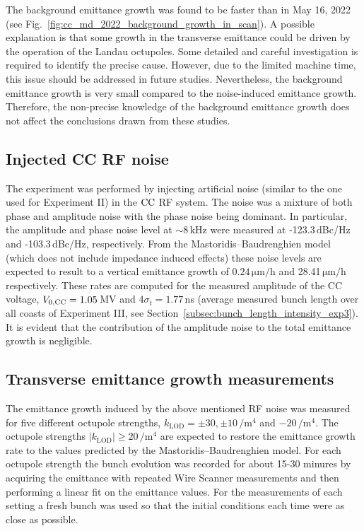 The background emittance growth was found to be faster than in May 16, 2022 (see Fig.~\ref{fig:cc_md_2022_background_growth_in_scan}). A possible explanation is that some growth in the transverse emittance could be driven by the operation of the Landau octupoles. Some detailed and careful investigation is required to identify the precise cause. However, due to the limited machine time, this issue should be addressed in future studies. Nevertheless, the background emittance growth is very small compared to the noise-induced emittance growth. Therefore, the non-precise knowledge of the background emittance growth does not affect the conclusions drawn from these studies. 



\subsection{Injected CC RF noise}\label{subsec:cc_rf_noise_exp3}
The experiment was performed by injecting artificial noise (similar to the one used for Experiment II) in the ${\mathrm{CC}}$ RF system. The noise was a mixture of both phase and amplitude noise with the phase noise being dominant. In particular, the amplitude and phase noise level at $\sim$8\,kHz were measured at -123.3\,dBc/Hz and -103.3\,dBc/Hz, respectively. From the Mastoridis--Baudrenghien model (which does not include impedance induced effects) these noise levels are expected to result to a vertical emittance growth of $0.24$\,$\mathrm{\mu m/h}$ and 28.41\,$\mathrm{\mu m/h}$ respectively. These rates are computed for the measured amplitude of the CC voltage, ${V_\mathrm{0, CC}}=1.05$\,MV and $4\sigma_t=1.77$\,ns (average measured bunch length over all coasts of Experiment III, see Section~\ref{subsec:bunch_length_intensity_exp3}). It is evident that the contribution of the amplitude noise to the total emittance growth is negligible. %


\subsection{Transverse emittance growth measurements}\label{subsec:cc_rf_noise_emit_growth_exp3}
The emittance growth induced by the above mentioned RF noise was measured for five different octupole strengths, $k_\mathrm{LOD}=\pm 30, \pm 10$\,$\mathrm{/m^4}$ and $-20$\,$\mathrm{/m^4}$. The octupole strengths $| k_\mathrm{LOD} | \geq 20$\,$\mathrm{/m^4}$ are expected to restore the emittance growth rate to the values predicted by the Mastoridis--Baudrenghien model. For each octupole strength the bunch evolution was recorded for about 15-30 minures by acquiring the emittance with repeated Wire Scanner measurements and then performing a linear fit on the emittance values. For the measurements of each setting a fresh bunch was used so that the initial conditions each time were as close as possible.

